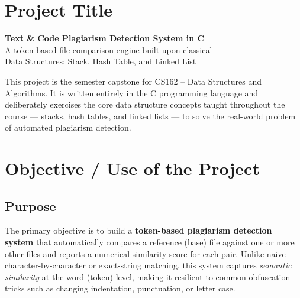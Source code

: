 \documentclass[12pt,a4paper]{article}
\begin{document}
\newpage

\thispagestyle{fancy}
\renewcommand{\contentsname}{\color{primaryblue}Table of Contents}
\tableofcontents
\newpage


\section{Project Title}

\begin{mdframed}[backgroundcolor=boxblue, linecolor=accentblue,
                 linewidth=1.5pt, innertopmargin=10pt,
                 innerbottommargin=10pt, innerleftmargin=14pt,
                 innerrightmargin=14pt]
  \centering
  {\LARGE\bfseries\color{primaryblue}
    Text \& Code Plagiarism Detection System in C}\\[0.4cm]
  {\normalsize
    A token-based file comparison engine built upon classical\\
    Data Structures: Stack, Hash Table, and Linked List}
\end{mdframed}

\vspace{0.5cm}

This project is the semester capstone for CS162 – Data Structures and Algorithms. It is written entirely in the C programming language and deliberately exercises the core data structure concepts taught throughout the course — stacks, hash tables, and linked lists — to solve the real-world problem of automated plagiarism detection.

\section{Objective / Use of the Project}

\subsection{Purpose}

The primary objective is to build a \textbf{token-based plagiarism detection system} that automatically compares a reference (base) file against one or more other files and reports a numerical similarity score for each pair. Unlike naive character-by-character or exact-string matching, this system captures \emph{semantic similarity} at the word (token) level, making it resilient to common obfuscation tricks such as changing indentation, punctuation, or letter case.
\end{document}
